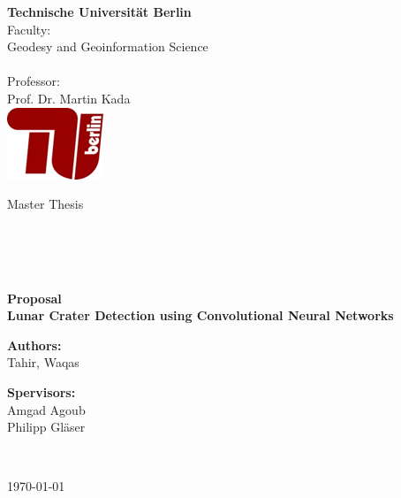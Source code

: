 \documentclass[11pt]{article}
\begin{document}
\begin{titlepage}
	\begin{multicols}{2} 
		\textbf {Technische Universit\"{a}t Berlin}\\
		Faculty:            \\ Geodesy and Geoinformation Science\\  \\
		Professor: \\
		Prof. Dr. Martin Kada\\
		\columnbreak
		\flushright
		\includegraphics{files/TU} 
	\end{multicols}

	\vspace{0.1\textheight}
	
	\begin{center}
		Master Thesis
	\end{center}
	
	\begin{verbatim}
 
 
 
	\end{verbatim}
	\begin{center}
		\textbf{\Large{Proposal \\ Lunar Crater Detection using Convolutional Neural Networks}}\\
	\end{center}

	\vspace{0.35\textheight}

	\begin{center}
		\vspace{0.7cm}
		\textbf{Authors:}\\
		Tahir, Waqas \\
	\end{center}
	\begin{center}	
		\textbf{Spervisors:}\\
		Amgad Agoub\\
		Philipp Gläser\\
	\end{center}
	\begin{verbatim}
 
	\end{verbatim}
	\begin{center}
		\today
	\end{center}

\end{titlepage}
\end{document}
